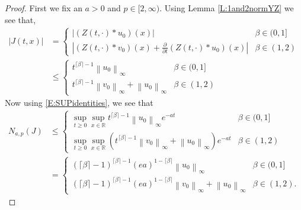 \documentclass[a4paper,11pt]{article}
\numberwithin{equation}{section}
\theoremstyle{plain}
\theoremstyle{definition}
\newcommand{\Norm}[1]{\left\|  #1   \right\|}
\newcommand{\R}{\mathbb{R}}
\numberwithin{NQ}{section}
\numberwithin{LQ}{section}
\numberwithin{ZQ}{section}
\begin{document}
	\begin{proof}
		First we fix an $a>0$ and $p \in [2,\infty)$. Using Lemma \ref{L:1and2normYZ} we see that,
		\begin{align*}
		|J(t,x)|  &= \begin{cases} 
		\left| (Z(t,\cdot) * u_0)(x)  \right| & \beta \in (0,1]
		\\	\left| (Z(t,\cdot) * v_0)(x) + \frac{\partial}{\partial t}(Z(t,\cdot) * u_0)(x) \right| & \beta \in (1,2)
		\end{cases}
		\\& \le \begin{cases}
		t^{\lceil \beta \rceil -1}\Norm{u_0}_\infty & \beta \in (0,1]
		\\ t^{\lceil \beta \rceil -1}\Norm{v_0}_\infty + \Norm{u_0}_\infty & \beta \in (1,2)
		\end{cases} 
		\end{align*}
		Now using \eqref{E:SUPidentities}, we see that 
		\begin{align}
		N_{a,p}(J) &\le \begin{cases} 
		\sup_{t\ge 0}\sup_{x\in\R}  t^{\lceil \beta \rceil -1}\Norm{u_0}_\infty e^{-at} & \beta \in (0,1]
		\\ \sup_{t\ge 0}\sup_{x\in\R} \left(  t^{\lceil \beta \rceil -1}\Norm{v_0}_\infty + \Norm{u_0}_\infty \right) e^{-at} & \beta \in (1,2)
		\end{cases} \nonumber
		\\ &= \begin{cases} 
		(\lceil \beta \rceil - 1)^{\lceil \beta \rceil -1}(ea)^{1-\lceil \beta \rceil} \Norm{u_0}_\infty  & \beta \in (0,1]
		\\ (\lceil \beta \rceil - 1)^{\lceil \beta \rceil -1}(ea)^{1-\lceil \beta \rceil} \Norm{v_0}_\infty + \Norm{u_0}_\infty & \beta \in (1,2). 
		\end{cases} \label{E:Jbdd}
		\end{align}
		

\end{proof}
\end{document}
